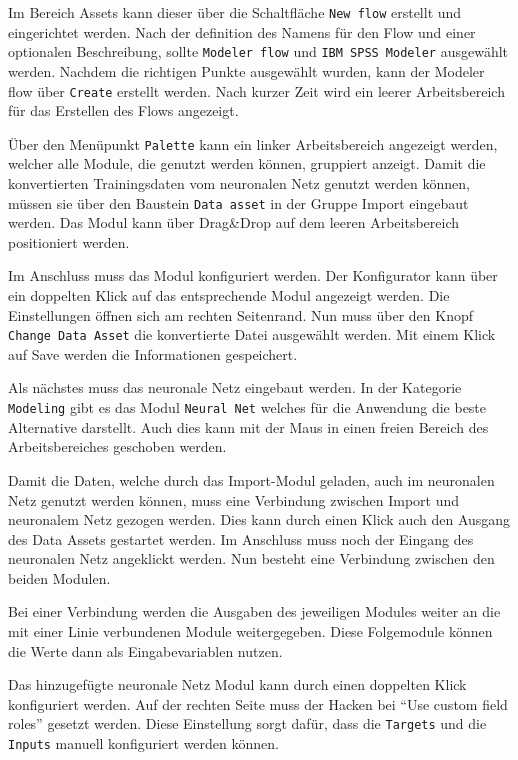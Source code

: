 Im Bereich Assets kann dieser über die Schaltfläche \texttt{New flow} erstellt und eingerichtet werden. Nach der definition
des Namens für den Flow und einer optionalen Beschreibung, sollte \texttt{Modeler flow} und \texttt{IBM SPSS Modeler}
ausgewählt werden. Nachdem die richtigen Punkte ausgewählt wurden, kann der Modeler flow über \texttt{Create} erstellt
werden. Nach kurzer Zeit wird ein leerer Arbeitsbereich für das Erstellen des Flows angezeigt.

Über den Menüpunkt \texttt{Palette} kann ein linker Arbeitsbereich angezeigt werden, welcher alle Module, die genutzt
werden können, gruppiert anzeigt. Damit die konvertierten Trainingsdaten vom neuronalen Netz genutzt werden können,
müssen sie über den Baustein \texttt{Data asset} in der Gruppe Import eingebaut werden. Das Modul kann über Drag\&Drop
auf dem leeren Arbeitsbereich positioniert werden.

Im Anschluss muss das Modul konfiguriert werden. Der Konfigurator kann über ein doppelten Klick auf das entsprechende
Modul angezeigt werden. Die Einstellungen öffnen sich am rechten Seitenrand. Nun muss über den Knopf
\texttt{Change Data Asset} die konvertierte Datei ausgewählt werden. Mit einem Klick auf Save werden die Informationen
gespeichert.

Als nächstes muss das neuronale Netz eingebaut werden. In der Kategorie \texttt{Modeling} gibt es das Modul
\texttt{Neural Net} welches für die Anwendung die beste Alternative darstellt. Auch dies kann mit der Maus in einen
freien Bereich des Arbeitsbereiches geschoben werden.

Damit die Daten, welche durch das Import-Modul geladen, auch im neuronalen Netz genutzt werden können, muss eine
Verbindung zwischen Import und neuronalem Netz gezogen werden. Dies kann durch einen Klick auch den Ausgang des
Data Assets gestartet werden. Im Anschluss muss noch der Eingang des neuronalen Netz angeklickt werden. Nun besteht eine
Verbindung zwischen den beiden Modulen.

Bei einer Verbindung werden die Ausgaben des jeweiligen Modules weiter an die mit einer Linie verbundenen Module
weitergegeben. Diese Folgemodule können die Werte dann als Eingabevariablen nutzen.

Das hinzugefügte neuronale Netz Modul kann durch einen doppelten Klick konfiguriert werden. Auf der rechten Seite muss
der Hacken bei \enquote{Use custom field roles} gesetzt werden. Diese Einstellung sorgt dafür, dass die \texttt{Targets}
und die \texttt{Inputs} manuell konfiguriert werden können.

